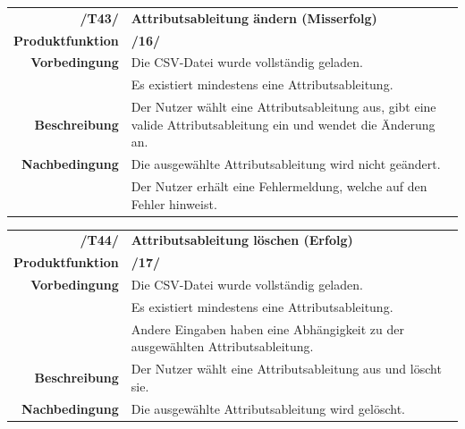 \documentclass{article}
\begin{document}
\begin{table}[H]
\begin{tabularx}{\textwidth}{rX}
 \vspace{1mm}
\textbf{/T43/}         & \textbf{Attributsableitung ändern (Misserfolg)} \\ \vspace{1mm}
\textbf{Produktfunktion} & \textbf{/16/} \\
\textbf{Vorbedingung}  & Die CSV-Datei wurde vollständig geladen. \\ \vspace{1mm} & Es existiert mindestens eine Attributsableitung.   \\ \vspace{1mm}
\textbf{Beschreibung}  & Der Nutzer wählt eine Attributsableitung aus, gibt eine valide Attributsableitung ein und wendet die Änderung an. \\
\textbf{Nachbedingung} & Die ausgewählte Attributsableitung wird nicht geändert. \\ & Der Nutzer erhält eine Fehlermeldung, welche auf den Fehler hinweist.
\end{tabularx}
\end{table}

\begin{table}[H]
\begin{tabularx}{\textwidth}{rX}
 \vspace{1mm}
\textbf{/T44/}         & \textbf{Attributsableitung löschen (Erfolg)} \\ \vspace{1mm}
\textbf{Produktfunktion} & \textbf{/17/} \\
\textbf{Vorbedingung}  & Die CSV-Datei wurde vollständig geladen. \\ & Es existiert mindestens eine Attributsableitung.  \\ \vspace{1mm} & Andere Eingaben haben eine Abhängigkeit zu der ausgewählten Attributsableitung. \\ \vspace{1mm}
\textbf{Beschreibung}  & Der Nutzer wählt eine Attributsableitung aus und löscht sie. \\
\textbf{Nachbedingung} & Die ausgewählte Attributsableitung wird gelöscht.
\end{tabularx}
\end{table}
\end{document}
